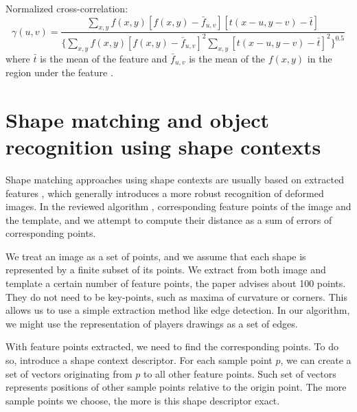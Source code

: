 Normalized cross-correlation: 
\[
\gamma(u,v) = \frac{\sum_{x,y}f(x,y) [f(x,y)-\bar{f}_{u,v}][t(x-u,y-v)-\bar{t}]} {\{ \sum_{x,y}f(x,y) [f(x,y)-\bar{f}_{u,v}]^2 \sum_{x,y}[t(x-u,y-v)-\bar{t}]^2\}^{0.5}}
\]
where $\bar{t}$ is the mean of the feature  and $\bar{f}_{u,v}$ is the mean of the  $f(x,y)$ in the region under the feature \cite{crossCorrLewis}.

\section{Shape matching and object recognition using shape contexts}
Shape matching approaches using  shape contexts are usually based on extracted features , which generally introduces a more robust recognition of deformed images. In the reviewed algorithm   \citet{simple},   corresponding feature points of the image and the template, and we attempt to compute their distance as a sum of errors of corresponding points.

We treat an image as a set of points, and we assume that each shape is represented by a finite subset of its points. We extract from both image and template a certain number of feature points, the paper  advises about 100 points. They  do not need to be key-points, such as maxima of curvature or corners. This allows us to use a simple extraction method like edge detection. In our  algorithm, we might use the representation of players drawings as a set of edges. 

With feature points extracted, we need to find the corresponding points. To do so, \citet{simple} introduce a shape context descriptor. For each sample point $p$, we can create a set of vectors originating from $p$ to all other feature points. Such set of vectors represents positions of other sample points relative to the origin point. The more sample points we choose, the more is this shape descriptor exact. 

